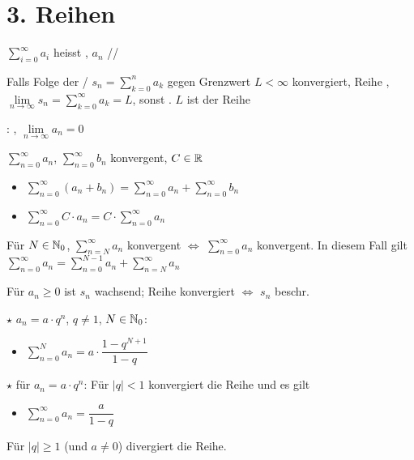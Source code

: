 \section{3. Reihen}

\Def $\sum_{i=0}^{\infty} a_i$ heisst ,
$a_n$ //

\Def Falls Folge der /
$s_n = \sum_{k=0}^{n} a_k$ gegen Grenzwert $L < \infty$ konvergiert,
Reihe , $\lim\limits_{n\to\infty} s_n = \sum_{k=0}^{\infty} a_k = L$,
sonst . $L$ ist  der Reihe

\Satz {}: , $\lim\limits_{n\to\infty} a_n = 0$

\Satz $\sum_{n=0}^{\infty} a_n$, $\sum_{n=0}^{\infty} b_n$ konvergent, $C \in \mathbb{R}$
\vspace{-0.6em}
\begin{itemize}
    \item $\sum_{n=0}^{\infty} (a_n + b_n) = \sum_{n=0}^{\infty} a_n + \sum_{n=0}^{\infty} b_n$
    \item $\sum_{n=0}^{\infty} C \cdot a_n = C \cdot \sum_{n=0}^{\infty} a_n$
\end{itemize}

\Satz Für $N \in \mathbb{N}_0$, $\sum_{n=N}^{\infty} a_n$ konvergent $\iff$ $\sum_{n=0}^{\infty} a_n$ konvergent.
In diesem Fall gilt $\sum_{n=0}^{\infty} a_n = \sum_{n=0}^{N-1} a_n + \sum_{n=N}^{\infty} a_n$

\Satz Für $a_n\ge 0$ ist $s_n$ wachsend; Reihe konvergiert $\iff$ $s_n$ beschr.

\Satz $\star$  $a_n = a \cdot q^n$, $q \ne 1$, $N \in \mathbb{N}_0$:
\vspace{-0.6em}
\begin{itemize}
    \item $\sum_{n=0}^{N} a_n = a \cdot \dfrac{1 - q^{N+1}}{1 - q}$
\end{itemize}

\Satz $\star$  für $a_n = a \cdot q^n$: Für $|q| < 1$ konvergiert die Reihe und es gilt
\vspace{-0.6em}
\begin{itemize}
    \item $\sum_{n=0}^{\infty} a_n = \dfrac{a}{1 - q}$
\end{itemize}
Für $|q| \ge 1$ (und $a \ne 0$) divergiert die Reihe.

